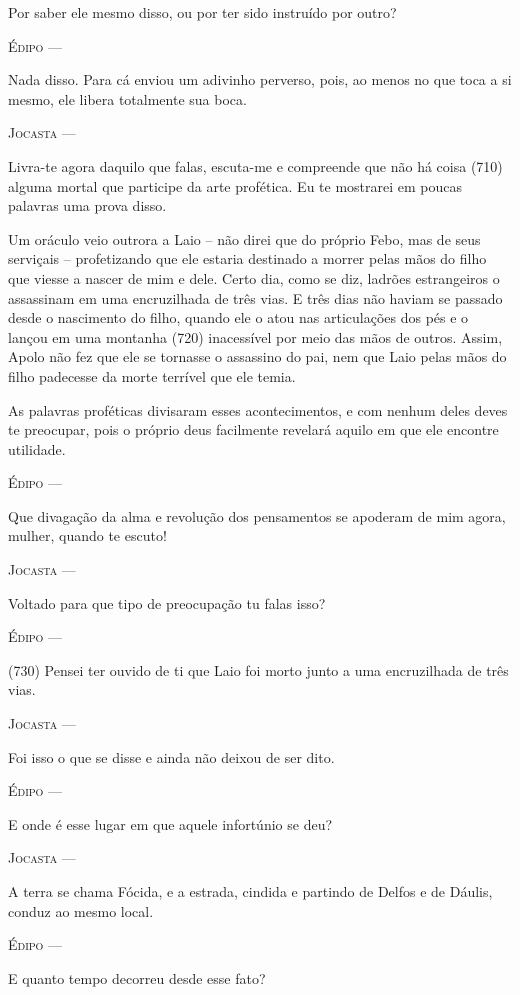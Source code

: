 Por saber ele mesmo disso, ou por ter sido instruído por outro?

\textsc{Édipo} ---

Nada disso. Para cá enviou um adivinho perverso, pois, ao menos no que
toca a si mesmo, ele libera totalmente sua boca.

\textsc{Jocasta} ---

Livra-te agora daquilo que falas, escuta-me e compreende que não há
coisa (710) alguma mortal que participe da arte profética. Eu te
mostrarei em poucas palavras uma prova disso.

Um oráculo veio outrora a Laio -- não direi que do próprio Febo, mas de
seus serviçais -- profetizando que ele estaria destinado a morrer pelas
mãos do filho que viesse a nascer de mim e dele. Certo dia, como se diz,
ladrões estrangeiros o assassinam em uma encruzilhada de três vias. E
três dias não haviam se passado desde o nascimento do filho, quando ele
o atou nas articulações dos pés e o lançou em uma montanha (720)
inacessível por meio das mãos de outros. Assim, Apolo não fez que ele se
tornasse o assassino do pai, nem que Laio pelas mãos do filho padecesse
da morte terrível que ele temia.

As palavras proféticas divisaram esses acontecimentos, e com nenhum
deles deves te preocupar, pois o próprio deus facilmente revelará aquilo
em que ele encontre utilidade.

\textsc{Édipo} ---

Que divagação da alma e revolução dos pensamentos se apoderam de mim
agora, mulher, quando te escuto!

\textsc{Jocasta} ---

Voltado para que tipo de preocupação tu falas isso?

\textsc{Édipo} ---

(730) Pensei ter ouvido de ti que Laio foi morto junto a uma
encruzilhada de três vias.

\textsc{Jocasta} ---

Foi isso o que se disse e ainda não deixou de ser dito.

\textsc{Édipo} ---

E onde é esse lugar em que aquele infortúnio se deu?

\textsc{Jocasta} ---

A terra se chama Fócida, e a estrada, cindida e partindo de Delfos e de
Dáulis, conduz ao mesmo local.

\textsc{Édipo} ---

E quanto tempo decorreu desde esse fato?

